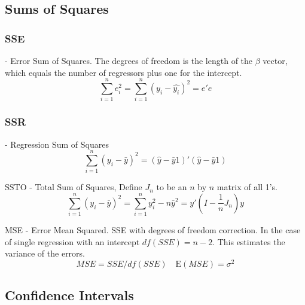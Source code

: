 \documentclass[12pt]{article}
\newcommand{\E}{\mathrm{E}}
\begin{document}
\subsection{Sums of Squares}

\subsubsection{SSE} - Error Sum of Squares. The degrees of freedom is the
length of the $\beta$ vector, which equals the number of regressors plus
one for the intercept.
\[
    \sum_{i=1}^n e_i^2 = \sum_{i=1}^n (y_i - \hat{y_i})^2
    = e'e
\]

\subsubsection{SSR} - Regression Sum of Squares
\[
    \sum_{i=1}^n (y_i - \bar{y})^2
    = (\hat{y} - \bar{y} 1)' (\hat{y} - \bar{y} 1) 
\]

SSTO - Total Sum of Squares, Define $J_n$ to be an $n$ by $n$ matrix of all 1's.
\[
    \sum_{i=1}^n (y_i - \bar{y})^2 = \sum_{i=1}^n y_i^2 - n\bar{y}^2
    = y'(I - \frac{1}{n} J_n)y
\]

MSE - Error Mean Squared. SSE with degrees of freedom correction. In the
case of single regression with an intercept $df(SSE) = n-2$. This estimates
the variance of the errors.
\[
    MSE = SSE / df(SSE) \quad \E(MSE) = \sigma^2
\]

\subsection{Confidence Intervals}
\end{document}
